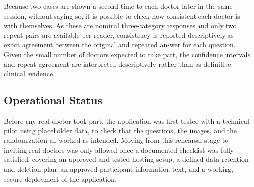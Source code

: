 Because two cases are shown a second time to each doctor later in the same session, without saying so, it is possible to check how consistent each doctor is with themselves. As these are nominal three-category responses and only two repeat pairs are available per reader, consistency is reported descriptively as exact agreement between the original and repeated answer for each question. Given the small number of doctors expected to take part, the confidence intervals and repeat agreement are interpreted descriptively rather than as definitive clinical evidence.

\subsection{Operational Status}

Before any real doctor took part, the application was first tested with a technical pilot using placeholder data, to check that the questions, the images, and the randomization all worked as intended. Moving from this rehearsal stage to inviting real doctors was only allowed once a documented checklist was fully satisfied, covering an approved and tested hosting setup, a defined data retention and deletion plan, an approved participant information text, and a working, secure deployment of the application.
